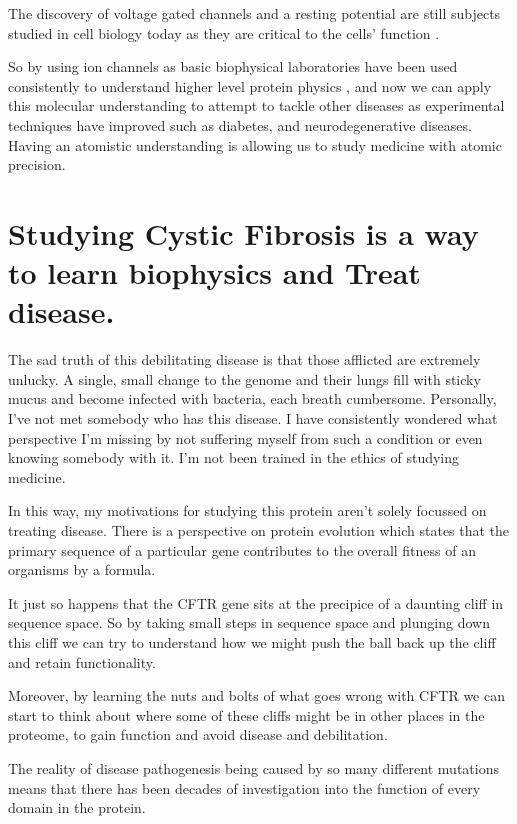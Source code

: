 The discovery of voltage gated channels and a resting potential are still subjects studied in cell biology today as they are critical to the cells' function \cite{}.

So by using ion channels as basic biophysical laboratories have been used consistently to understand higher level protein physics \cite{}, and now we can apply this molecular understanding to attempt to tackle other diseases as experimental techniques have improved such as diabetes, and neurodegenerative diseases. Having an atomistic understanding is allowing us to study medicine with atomic precision.


\section{Studying Cystic Fibrosis is a way to learn biophysics and Treat disease.} 

The sad truth of this debilitating disease is that those afflicted are extremely unlucky. A single, small change to the genome and their lungs fill with sticky mucus and become infected with bacteria, each breath cumbersome. Personally, I've not met somebody who has this disease. I have consistently wondered what perspective I'm missing by not suffering myself from such a condition or even knowing somebody with it. I'm not been trained in the ethics of studying medicine.

In this way, my motivations for studying this protein aren't solely focussed on treating disease. There is a perspective on protein evolution which states that the primary sequence of a particular gene contributes to the overall fitness of an organisms by a formula. \cite{}


It just so happens that the CFTR gene sits at the precipice of a daunting cliff in sequence space. So by taking small steps in sequence space and plunging down this cliff we can try to understand how we might push the ball back up the cliff and retain functionality.

Moreover, by learning the nuts and bolts of what goes wrong with CFTR we can start to think about where some of these cliffs might be in other places in the proteome, to gain function and avoid disease and debilitation.

The reality of disease pathogenesis being caused by so many different mutations means that there has been decades of investigation into the function of every domain in the protein. 

